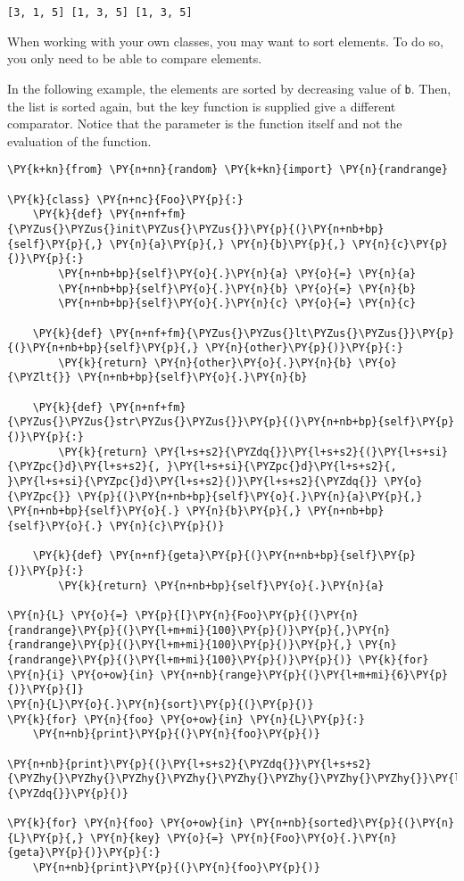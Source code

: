 \texttt{[3, 1, 5] [1, 3, 5]
[1, 3, 5]
}


When working with your own classes, you may want to sort elements.  To do so, you only need to be able to compare elements.


In the following example, the elements are sorted by decreasing value of \texttt{b}.  Then, the list is sorted again, but the key function is supplied give a different comparator.  Notice that the parameter is the function itself and not the evaluation of the function.


\begin{Verbatim}[commandchars=\\\{\}]
\PY{k+kn}{from} \PY{n+nn}{random} \PY{k+kn}{import} \PY{n}{randrange}

\PY{k}{class} \PY{n+nc}{Foo}\PY{p}{:}
    \PY{k}{def} \PY{n+nf+fm}{\PYZus{}\PYZus{}init\PYZus{}\PYZus{}}\PY{p}{(}\PY{n+nb+bp}{self}\PY{p}{,} \PY{n}{a}\PY{p}{,} \PY{n}{b}\PY{p}{,} \PY{n}{c}\PY{p}{)}\PY{p}{:}
        \PY{n+nb+bp}{self}\PY{o}{.}\PY{n}{a} \PY{o}{=} \PY{n}{a}
        \PY{n+nb+bp}{self}\PY{o}{.}\PY{n}{b} \PY{o}{=} \PY{n}{b}
        \PY{n+nb+bp}{self}\PY{o}{.}\PY{n}{c} \PY{o}{=} \PY{n}{c}

    \PY{k}{def} \PY{n+nf+fm}{\PYZus{}\PYZus{}lt\PYZus{}\PYZus{}}\PY{p}{(}\PY{n+nb+bp}{self}\PY{p}{,} \PY{n}{other}\PY{p}{)}\PY{p}{:}
        \PY{k}{return} \PY{n}{other}\PY{o}{.}\PY{n}{b} \PY{o}{\PYZlt{}} \PY{n+nb+bp}{self}\PY{o}{.}\PY{n}{b}

    \PY{k}{def} \PY{n+nf+fm}{\PYZus{}\PYZus{}str\PYZus{}\PYZus{}}\PY{p}{(}\PY{n+nb+bp}{self}\PY{p}{)}\PY{p}{:}
        \PY{k}{return} \PY{l+s+s2}{\PYZdq{}}\PY{l+s+s2}{(}\PY{l+s+si}{\PYZpc{}d}\PY{l+s+s2}{, }\PY{l+s+si}{\PYZpc{}d}\PY{l+s+s2}{, }\PY{l+s+si}{\PYZpc{}d}\PY{l+s+s2}{)}\PY{l+s+s2}{\PYZdq{}} \PY{o}{\PYZpc{}} \PY{p}{(}\PY{n+nb+bp}{self}\PY{o}{.}\PY{n}{a}\PY{p}{,} \PY{n+nb+bp}{self}\PY{o}{.} \PY{n}{b}\PY{p}{,} \PY{n+nb+bp}{self}\PY{o}{.} \PY{n}{c}\PY{p}{)}

    \PY{k}{def} \PY{n+nf}{geta}\PY{p}{(}\PY{n+nb+bp}{self}\PY{p}{)}\PY{p}{:}
        \PY{k}{return} \PY{n+nb+bp}{self}\PY{o}{.}\PY{n}{a}

\PY{n}{L} \PY{o}{=} \PY{p}{[}\PY{n}{Foo}\PY{p}{(}\PY{n}{randrange}\PY{p}{(}\PY{l+m+mi}{100}\PY{p}{)}\PY{p}{,}\PY{n}{randrange}\PY{p}{(}\PY{l+m+mi}{100}\PY{p}{)}\PY{p}{,} \PY{n}{randrange}\PY{p}{(}\PY{l+m+mi}{100}\PY{p}{)}\PY{p}{)} \PY{k}{for} \PY{n}{i} \PY{o+ow}{in} \PY{n+nb}{range}\PY{p}{(}\PY{l+m+mi}{6}\PY{p}{)}\PY{p}{]}
\PY{n}{L}\PY{o}{.}\PY{n}{sort}\PY{p}{(}\PY{p}{)}
\PY{k}{for} \PY{n}{foo} \PY{o+ow}{in} \PY{n}{L}\PY{p}{:}
    \PY{n+nb}{print}\PY{p}{(}\PY{n}{foo}\PY{p}{)}

\PY{n+nb}{print}\PY{p}{(}\PY{l+s+s2}{\PYZdq{}}\PY{l+s+s2}{\PYZhy{}\PYZhy{}\PYZhy{}\PYZhy{}\PYZhy{}\PYZhy{}\PYZhy{}\PYZhy{}}\PY{l+s+s2}{\PYZdq{}}\PY{p}{)}

\PY{k}{for} \PY{n}{foo} \PY{o+ow}{in} \PY{n+nb}{sorted}\PY{p}{(}\PY{n}{L}\PY{p}{,} \PY{n}{key} \PY{o}{=} \PY{n}{Foo}\PY{o}{.}\PY{n}{geta}\PY{p}{)}\PY{p}{:}
    \PY{n+nb}{print}\PY{p}{(}\PY{n}{foo}\PY{p}{)}
\end{Verbatim}


